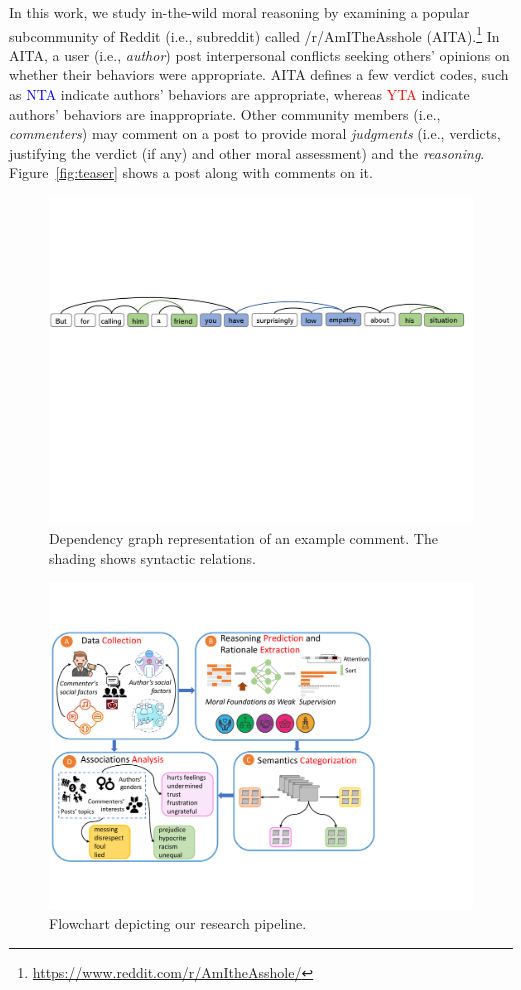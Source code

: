 \documentclass[letterpaper]{article} %
\begin{document}
In this work, we study in-the-wild moral reasoning by examining a popular subcommunity of Reddit (i.e., subreddit) called /r/AmITheAsshole (AITA).\footnote{\url{https://www.reddit.com/r/AmItheAsshole/}}
In AITA, a user (i.e., \emph{author}) post interpersonal conflicts seeking others' opinions on whether their behaviors were appropriate.
AITA defines a few verdict codes, such as \textcolor{blue}{NTA} indicate authors' behaviors are appropriate, whereas \textcolor{red}{YTA} indicate authors' behaviors are inappropriate.
Other community members (i.e., \emph{commenters}) may comment on a post to provide moral \emph{judgments} (i.e., verdicts, justifying the verdict (if any) and other moral assessment) and the \emph{reasoning}.
Figure~\ref{fig:teaser} shows a post along with comments on it.
\begin{figure}[!htb]
    \centering
    \includegraphics[clip, trim=0cm 12.5cm 0.5cm 6.4cm, width=\textwidth]{figs/example.pdf}
    \caption{Dependency graph representation of an example comment. The shading shows syntactic relations.}
    \label{fig:example}
\end{figure}
\begin{figure}[!htb]
    \centering
    \includegraphics[clip, trim=0.1cm 2.8cm 6.5cm 3.2cm, width=1\columnwidth]{figs/framework.pdf}
    \caption{Flowchart depicting our research pipeline.}
    \label{fig:framework}
\end{figure}
\end{document}
